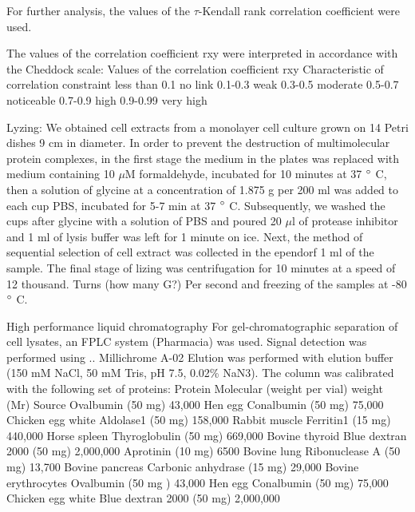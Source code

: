 \documentclass[english,authoryear]{elsarticle}
\begin{document}
For further analysis,
the values of
the $\tau$-Kendall rank correlation coefficient
 were used.


The values of the correlation coefficient rxy were interpreted in accordance with the Cheddock scale:
Values of the correlation coefficient rxy Characteristic of correlation constraint
less than 0.1 no link
0.1-0.3 weak
0.3-0.5 moderate
0.5-0.7 noticeable
0.7-0.9 high
0.9-0.99 very high
\cite{tinevez2017trackmate}

\cite{mclean2018trajr}
Lyzing:
We obtained cell extracts from a monolayer cell culture grown on 14 Petri dishes 9 cm in diameter.
In order to prevent the destruction of multimolecular protein complexes, in the first stage the medium in the plates was replaced with medium containing 10 $\mu$M formaldehyde, incubated for 10 minutes at 37 $\degree$ C, then a solution of glycine at a concentration of 1.875 g per 200 ml was added to each cup PBS, incubated for 5-7 min at 37 $\degree$  C. Subsequently, we washed the cups after glycine with a solution of PBS and poured 20 $\mu$l of protease inhibitor and 1 ml of lysis buffer was left for 1 minute on ice.
Next, the method of sequential selection of cell extract was collected in the ependorf 1 ml of the sample. The final stage of lizing was centrifugation for 10 minutes at a speed of 12 thousand. Turns (how many G?) Per second and freezing of the samples at -80 $\degree$  C.

High performance liquid chromatography
For gel-chromatographic separation of cell lysates, an FPLC system (Pharmacia) was used.
Signal detection was performed using .. Millichrome A-02
Elution was performed with elution buffer (150 mM NaCl, 50 mM Tris, pH 7.5, 0.02\% NaN3).
The column was calibrated with the following set of proteins:
Protein Molecular (weight per vial) weight (Mr) Source Ovalbumin (50 mg) 43,000 Hen egg Conalbumin (50 mg) 75,000 Chicken egg white Aldolase1 (50 mg) 158,000 Rabbit muscle Ferritin1 (15 mg) 440,000 Horse spleen Thyroglobulin (50 mg) 669,000 Bovine thyroid Blue dextran 2000 (50 mg) 2,000,000 Aprotinin (10 mg) 6500 Bovine lung Ribonuclease A (50 mg) 13,700 Bovine pancreas Carbonic anhydrase (15 mg) 29,000 Bovine erythrocytes Ovalbumin (50 mg ) 43,000 Hen egg Conalbumin (50 mg) 75,000 Chicken egg white Blue dextran 2000 (50 mg) 2,000,000
\end{document}
